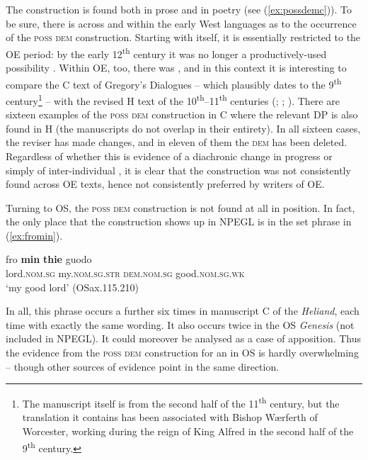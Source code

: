 \documentclass[output=paper,colorlinks,citecolor=brown]{langscibook}
\begin{document}
The construction is found both in prose and in poetry (see (\ref{ex:possdemc})). To be sure, there is  across and within the early West  languages as to the occurrence of the \textsc{poss} \textsc{dem} construction. Starting with  itself, it is essentially restricted to the OE period: by the early 12\textsuperscript{th} century it was no longer a productively-used possibility \citep[161--164]{Allen2006}. Within OE, too, there was , and in this context it is interesting to compare the C text of Gregory's Dialogues -- which plausibly dates to the 9\textsuperscript{th} century\footnote{The manuscript itself is from the second half of the 11\textsuperscript{th} century, but the translation it contains has been associated with Bishop Wærferth of Worcester, working during the reign of King Alfred in the second half of the 9\textsuperscript{th} century.} -- with the revised H text of the 10\textsuperscript{th}--11\textsuperscript{th} centuries (\citealp[§10]{Yerkes1982}; \citealp[164]{Allen2006}; \citealp[180--181]{Wood2007}). There are sixteen examples of the \textsc{poss} \textsc{dem} construction in C where the relevant DP is also found in H (the manuscripts do not overlap in their entirety). In all sixteen cases, the reviser has made changes, and in eleven of them the \textsc{dem} has been deleted. Regardless of whether this is evidence of a diachronic change in progress or simply of inter-individual , it is clear that the construction was not consistently found across OE texts, hence not consistently preferred by writers of OE.

Turning to OS, the \textsc{poss} \textsc{dem} construction is not found at all in  position. In fact, the only place that the construction shows up in NPEGL is in the set phrase in (\ref{ex:fromin}).

\begin{exe}     
     \ex\gll\label{ex:fromin}fro \textbf{min} \textbf{thie} guodo\\
     lord.\textsc{nom.sg} my.\textsc{nom.sg.str} \textsc{dem.nom.sg} good.\textsc{nom.sg.wk}\\
     \glt `my good lord' (OSax.115.210)
\end{exe}     
     
In all, this phrase occurs a further six times in manuscript C of the \emph{Heliand}, each time with exactly the same wording. It also occurs twice in the OS \textit{Genesis} (not included in NPEGL). It could moreover be analysed as a case of apposition. Thus the evidence from the \textsc{poss} \textsc{dem} construction for an  in OS is hardly overwhelming -- though other sources of evidence point in the same direction.
\end{document}
